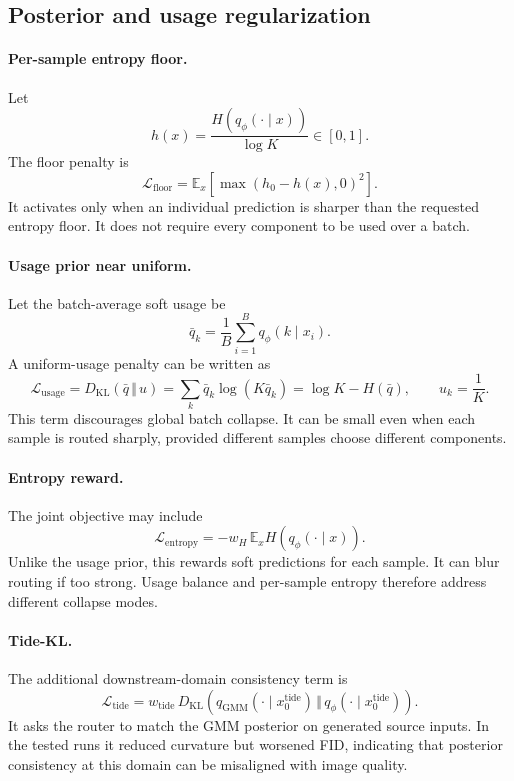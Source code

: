 \documentclass[11pt,a4paper]{article}
\newcommand{\kl}{D_{\mathrm{KL}}}
\begin{document}
\subsection{Posterior and usage regularization}

\paragraph{Per-sample entropy floor.}
Let
\[
 h(x)=\frac{H(q_\phi(\cdot\mid x))}{\log K}\in[0,1].
\]
The floor penalty is
\[
 \mathcal L_{\mathrm{floor}}
 =
 \mathbb E_x\left[\max(h_0-h(x),0)^2\right].
\]
It activates only when an individual prediction is sharper than the requested
entropy floor. It does not require every component to be used over a batch.

\paragraph{Usage prior near uniform.}
Let the batch-average soft usage be
\[
 \bar q_k=\frac1B\sum_{i=1}^{B}q_\phi(k\mid x_i).
\]
A uniform-usage penalty can be written as
\[
 \mathcal L_{\mathrm{usage}}
 =\kl(\bar q\,\Vert\,u)
 =\sum_k\bar q_k\log(K\bar q_k)
 =\log K-H(\bar q),
\qquad u_k=\frac1K.
\]
This term discourages global batch collapse. It can be small even when each
sample is routed sharply, provided different samples choose different
components.

\paragraph{Entropy reward.}
The joint objective may include
\[
 \mathcal L_{\mathrm{entropy}}
 =-w_H\,\mathbb E_x H(q_\phi(\cdot\mid x)).
\]
Unlike the usage prior, this rewards soft predictions for each sample. It can
blur routing if too strong. Usage balance and per-sample entropy therefore
address different collapse modes.

\paragraph{Tide-KL.}
The additional downstream-domain consistency term is
\[
 \mathcal L_{\mathrm{tide}}
 =
 w_{\mathrm{tide}}\,
 \kl\!\left(
 q_{\mathrm{GMM}}(\cdot\mid x_0^{\mathrm{tide}})
 \,\Vert\,
 q_\phi(\cdot\mid x_0^{\mathrm{tide}})
 \right).
\]
It asks the router to match the GMM posterior on generated source inputs. In
the tested runs it reduced curvature but worsened FID, indicating that
posterior consistency at this domain can be misaligned with image quality.
\end{document}
